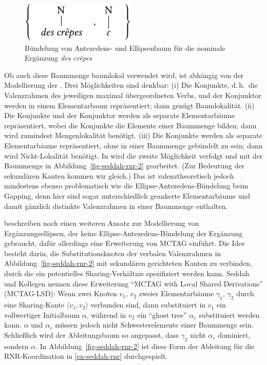 \begin{figure}[t]
\centering
\includegraphics{graphics/abb812.pdf}
\caption{\label{fig-seddah-rnr}Bündelung von Antezedens- und Ellipsenbaum für die nominale Ergänzung {\it des cr\^{e}pes}}
\end{figure}    
Ob auch diese Baummenge baumlokal verwendet wird, ist abhängig von der Modellierung der . Drei Möglichkeiten sind denkbar: (i) Die Konjunkte, d.\,h.\ die Valenzrahmen des jeweiligen maximal übergeordneten Verbs,  und der Konjunktor werden in einem Elementarbaum repräsentiert; dann genügt Baumlokalität. (ii) Die Konjunkte und der Konjunktor werden als separate Elementarbäume repräsentiert, wobei die Konjunkte die Elemente einer Baummenge bilden; dann wird zumindest Mengenlokalität benötigt. (iii) Die Konjunkte werden als separate Elementarbäume repräsentiert, ohne in einer Baummenge gebündelt zu sein; dann wird Nicht-Lokalität benötigt. In \citet[Abbildung~2]{Seddah:etal:10} wird die zweite Möglichkeit verfolgt und mit der Baummenge in Abbildung~\ref{fig-seddah-rnr-2} gearbeitet. (Zur Bedeutung der sekundären Kanten kommen wir gleich.) Das ist valenztheoretisch jedoch mindestens ebenso problematisch wie die Ellipse-Antezedens-Bündelung beim Gapping, denn hier sind sogar unterschiedlich geankerte Elementarbäume und damit gänzlich distinkte Valenzrahmen in einer Baummenge enthalten.    

\cite{Seddah:etal:10} beschreiben noch einen weiteren Ansatz zur Modellierung von Ergänzungsellipsen, der keine Ellipse-Antezedens-Bündelung der Ergänzung gebraucht, dafür allerdings eine Erweiterung von MCTAG einführt. Die Idee besteht darin, die Substitutionsknoten der verbalen Valenzrahmen in Abbildung~\ref{fig-seddah-rnr-2} mit sekundären gerichteten Kanten zu verbinden, durch die ein potentielles Sharing-Verhältnis spezifiziert werden kann. Seddah und Kollegen nennen diese Erweiterung "`MCTAG with Local Shared Derivations"' (MCTAG-LSD): Wenn zwei Knoten $v_1$, $v_2$  zweier Elementarbäume $\gamma_1$, $\gamma_2$ durch eine Sharing-Kante $\langle v_1,v_2 \rangle$ verbunden sind, dann substituiert in $v_1$ ein vollwertiger Initialbaum $\alpha$, während in $v_2$ ein "`ghost tree"' $\alpha_\varepsilon$ substituiert werden kann. $\alpha$ und $\alpha_\varepsilon$ müssen jedoch nicht Schwesterelemente einer Baummenge sein. Schlie\ss lich wird der Ableitungsbaum so angepasst, dass $\gamma_2$ nicht $\alpha_\varepsilon$ dominiert, sondern $\alpha$. In Abbildung~\ref{fig-seddah-rnr-2} ist diese Form der Ableitung für die RNR-Koordination in \ref{ex-seddah-rnr}  durchgespielt. 

